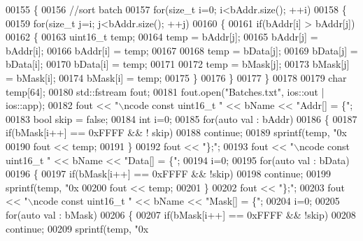 \begin{DoxyCode}
00155 \{
00156     \textcolor{comment}{//sort batch}
00157     \textcolor{keywordflow}{for}(\textcolor{keywordtype}{size\_t} i=0; i<bAddr.size(); ++i)
00158     \{
00159         \textcolor{keywordflow}{for}(\textcolor{keywordtype}{size\_t} j=i; j<bAddr.size(); ++j)
00160         \{
00161             \textcolor{keywordflow}{if}(bAddr[i] > bAddr[j])
00162             \{
00163                 uint16\_t temp;
00164                 temp = bAddr[j];
00165                 bAddr[j] = bAddr[i];
00166                 bAddr[i] = temp;
00167 
00168                 temp = bData[j];
00169                 bData[j] = bData[i];
00170                 bData[i] = temp;
00171 
00172                 temp = bMask[j];
00173                 bMask[j] = bMask[i];
00174                 bMask[i] = temp;
00175             \}
00176         \}
00177     \}
00178 
00179     \textcolor{keywordtype}{char} temp[64];
00180     std::fstream fout;
00181     fout.open(\textcolor{stringliteral}{"Batches.txt"}, ios::out | ios::app);
00182     fout << \textcolor{stringliteral}{"\(\backslash\)ncode const uint16\_t "} << bName << \textcolor{stringliteral}{"Addr[] = \{"};
00183     \textcolor{keywordtype}{bool} skip = \textcolor{keyword}{false};
00184     \textcolor{keywordtype}{int} i=0;
00185     \textcolor{keywordflow}{for}(\textcolor{keyword}{auto} val : bAddr)
00186     \{
00187         \textcolor{keywordflow}{if}(bMask[i++] == 0xFFFF && ! skip)
00188             \textcolor{keywordflow}{continue};
00189         sprintf(temp, \textcolor{stringliteral}{"0x%
00190         fout << temp;
00191     \}
00192     fout << \textcolor{stringliteral}{"\};"};
00193     fout << \textcolor{stringliteral}{"\(\backslash\)ncode const uint16\_t "} << bName << \textcolor{stringliteral}{"Data[] = \{"};
00194     i=0;
00195     \textcolor{keywordflow}{for}(\textcolor{keyword}{auto} val : bData)
00196     \{
00197         \textcolor{keywordflow}{if}(bMask[i++] == 0xFFFF && !skip)
00198             \textcolor{keywordflow}{continue};
00199         sprintf(temp, \textcolor{stringliteral}{"0x%
00200         fout << temp;
00201     \}
00202     fout << \textcolor{stringliteral}{"\};"};
00203     fout << \textcolor{stringliteral}{"\(\backslash\)ncode const uint16\_t "} << bName << \textcolor{stringliteral}{"Mask[] = \{"};
00204     i=0;
00205     \textcolor{keywordflow}{for}(\textcolor{keyword}{auto} val : bMask)
00206     \{
00207         \textcolor{keywordflow}{if}(bMask[i++] == 0xFFFF && !skip)
00208             \textcolor{keywordflow}{continue};
00209         sprintf(temp, \textcolor{stringliteral}{"0x%
}}}
\end{DoxyCode}
